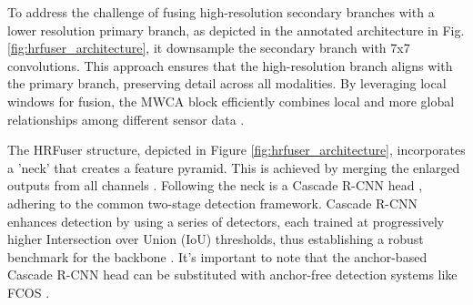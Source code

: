 \documentclass[report.tex]{subfiles}
\begin{document}
    To address the challenge of fusing high-resolution secondary branches with a lower resolution primary branch, as depicted in the annotated architecture in Fig. \ref{fig:hrfuser_architecture}, it downsample the secondary branch with 7x7 convolutions. This approach ensures that the high-resolution branch aligns with the primary branch, preserving detail across all modalities. By leveraging local windows for fusion, the MWCA block efficiently combines local and more global relationships among different sensor data \cite{broedermann2022hrfuser}.


    The HRFuser structure, depicted in Figure \ref{fig:hrfuser_architecture}, incorporates a 'neck' that creates a feature pyramid. This is achieved by merging the enlarged outputs from all channels \cite{wang2020hrnet}. Following the neck is a Cascade R-CNN head \cite{cai2018cascade}, adhering to the common two-stage detection framework. Cascade R-CNN enhances detection by using a series of detectors, each trained at progressively higher Intersection over Union (IoU) thresholds, thus establishing a robust benchmark for the backbone \cite{broedermann2022hrfuser}. It's important to note that the anchor-based Cascade R-CNN head can be substituted with anchor-free detection systems like FCOS \cite{tian2019fcos}.

\end{document}

